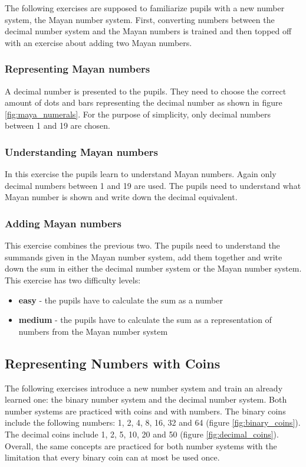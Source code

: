 The following exercises are supposed to familiarize pupils with a new number system, the Mayan number system. First, converting numbers between the decimal number system and the Mayan numbers is trained and then topped off with an exercise about adding two Mayan numbers.

\subsubsection*{Representing Mayan numbers}

A decimal number is presented to the pupils. They need to choose the correct amount of dots and bars representing the decimal number as shown in figure \ref{fig:maya_numerals}. For the purpose of simplicity, only decimal numbers between 1 and 19 are chosen.

\subsubsection*{Understanding Mayan numbers}

In this exercise the pupils learn to understand Mayan numbers. Again only decimal numbers between 1 and 19 are used. The pupils need to understand what Mayan number is shown and write down the decimal equivalent.

\subsubsection*{Adding Mayan numbers}

This exercise combines the previous two. The pupils need to understand the summands given in the Mayan number system, add them together and write down the sum in either the decimal number system or the Mayan number system. This exercise has two difficulty levels:

\begin{itemize}
  \item \textbf{easy} - the pupils have to calculate the sum as a number 
  \item \textbf{medium} - the pupils have to calculate the sum as a representation of numbers from the Mayan number system
\end{itemize}

\subsection*{Representing Numbers with Coins}

The following exercises introduce a new number system and train an already learned one: the binary number system and the decimal number system. Both number systems are practiced with coins and with numbers. The binary coins include the following numbers: 1, 2, 4, 8, 16, 32 and 64 (figure \ref{fig:binary_coins}). The decimal coins include 1, 2, 5, 10, 20 and 50 (figure \ref{fig:decimal_coins}). 
Overall, the same concepts are practiced for both number systems with the limitation that every binary coin can at most be used once.


